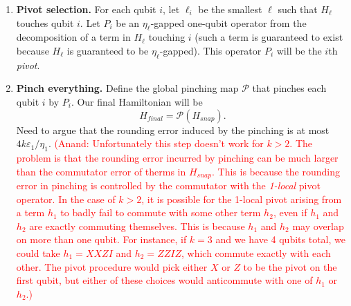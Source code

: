 \documentclass[11pt]{article}
\theoremstyle{plain}
\newcommand{\eps}{\varepsilon}
\newcommand{\AnandNote}[1]{\textcolor{red}{(Anand: #1)}}
\newcommand{\AnandNote}[1]{}
\renewcommand{\cP}{\mathcal{P}}
\begin{document}
\begin{enumerate}
    We now have defined an operator
    $H_{snap} = H_k + H_{k-1} + H_{k-2} + \dots + H_1 + H_0$ such that the following hold.
    \begin{itemize}
        \item Each $H_\ell$ consists of terms of locality $\ell$ with gap $\eta_{\ell}$. 
        \item For each $\ell$, the terms in $H_\ell$ have commutativity error at most $\eps_{\ell}$ with each other and with terms in $H_{\ell'}$ for $\ell' > \ell$. (TO BE PROVEN)
        \item Each term in $H_\ell$  has incurred a rounding error of $\eta_{k} + \eta_{k-1} + \dots + \eta_{\ell}$ from $H$ (check constant factors!).
    \end{itemize}
    \item \textbf{Pivot selection.} For each qubit $i$, let $\ell_i$ be the smallest $\ell$ such that $H_\ell$ touches qubit $i$. Let $P_i$ be an $\eta_\ell$-gapped one-qubit operator from the decomposition of a term in $H_\ell$ touching $i$ (such a term is guaranteed to exist because $H_\ell$ is guaranteed to be $\eta_\ell$-gapped). This operator $P_i$ will be the $i$th \emph{pivot}.
    \item \textbf{Pinch everything.} Define the global pinching map $\cP$ that pinches each qubit $i$ by $P_i$. Our final Hamiltonian will be
    \[ H_{final} = \cP(H_{snap}).\]
    Need to argue that the rounding error induced by the pinching is at most $4k\eps_{1}/\eta_1$. 
    \AnandNote{Unfortunately this step doesn't work for $k > 2$. The problem is that the rounding error incurred by pinching can be much larger than the commutator error of therms in $H_{snap}$. This is because the rounding error in pinching is controlled by the commutator with the \emph{1-local} pivot operator. In the case of $k>2$, it is possible for the 1-local pivot arising from a term $h_1$ to badly fail to commute with some other term $h_2$, even if $h_1$ and $h_2$ are exactly commuting themselves. This is because $h_1$ and $h_2$ may overlap on more than one qubit. For instance, if $k = 3$ and we have 4 qubits total, we could take $h_1 = XXZI$ and $h_2 = ZZIZ$, which commute exactly with each other. The pivot procedure would pick either $X$ or $Z$ to be the pivot on the first qubit, but either of these choices would anticommute with one of $h_1$ or $h_2$.}
\end{enumerate}

\newpage
\end{document}
